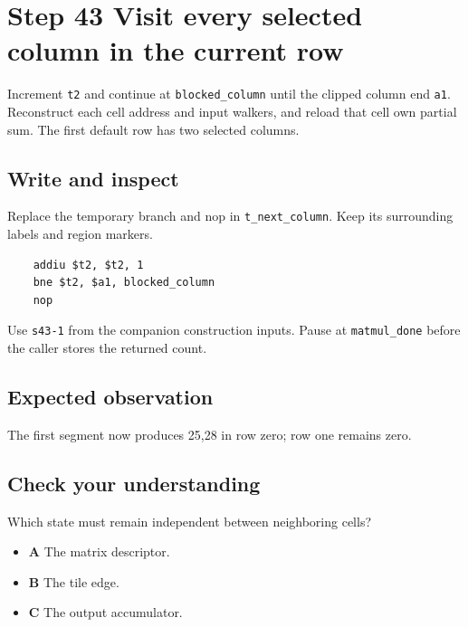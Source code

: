 \section{Step 43 Visit every selected column in the current row}\label{matmul-s43}

Increment \texttt{t2} and continue at \texttt{blocked\_column} until the clipped column end \texttt{a1}. Reconstruct each cell address and input walkers, and reload that cell own partial sum. The first default row has two selected columns.

\subsection{Write and inspect}
Replace the temporary branch and nop in \texttt{t\_next\_column}. Keep its surrounding labels and region markers.

\begin{verbatim}
    addiu $t2, $t2, 1
    bne $t2, $a1, blocked_column
    nop
\end{verbatim}
Use \texttt{s43-1} from the companion construction inputs. Pause at \texttt{matmul\_done} before the caller stores the returned count.

\subsection{Expected observation}
The first segment now produces 25,28 in row zero; row one remains zero.

\subsection{Check your understanding}
Which state must remain independent between neighboring cells?

\begin{itemize}
\item \textbf{A} The matrix descriptor.
\item \textbf{B} The tile edge.
\item \textbf{C} The output accumulator.
\end{itemize}
